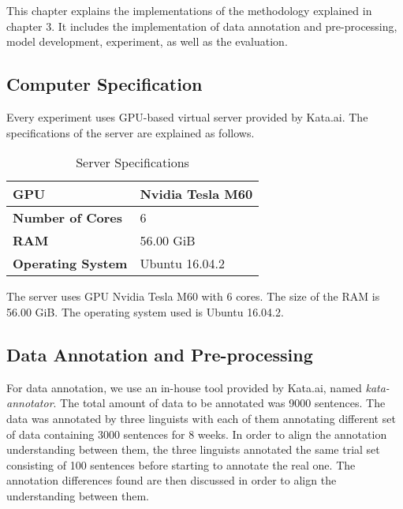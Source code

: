 \chapter{\babEmpat} \label{eksperimen}

This chapter explains the implementations of the methodology explained in chapter 3. It includes the implementation of data annotation and pre-processing, model development, experiment, as well as the evaluation.

\section{Computer Specification}
Every experiment uses GPU-based virtual server provided by Kata.ai. The specifications of the server are explained as follows.

\begin{table}
	\centering
	\caption{Server Specifications}
	\begin{tabular}{|l|l|}
		\hline
		\textbf{GPU} & Nvidia Tesla M60 \\ \hline
		\textbf{Number of Cores} & 6 \\ \hline
		\textbf{RAM} & 56.00 GiB \\ \hline
		\textbf{Operating System} & Ubuntu 16.04.2 \\ \hline
	\end{tabular}
	\label{table:spesifikasi hardware}
\end{table}

The server uses GPU Nvidia Tesla M60 with 6 cores. The size of the RAM is 56.00 GiB. The operating system used is Ubuntu 16.04.2.

\section{Data Annotation and Pre-processing}
For data annotation, we use an in-house tool provided by Kata.ai, named \textit{kata-annotator}. The total amount of data to be annotated was 9000 sentences. The data was annotated by three linguists with each of them annotating different set of data containing 3000 sentences for 8 weeks. In order to align the annotation understanding between them, the three linguists annotated the same trial set consisting of 100 sentences before starting to annotate the real one. The annotation differences found are then discussed in order to align the understanding between them.

